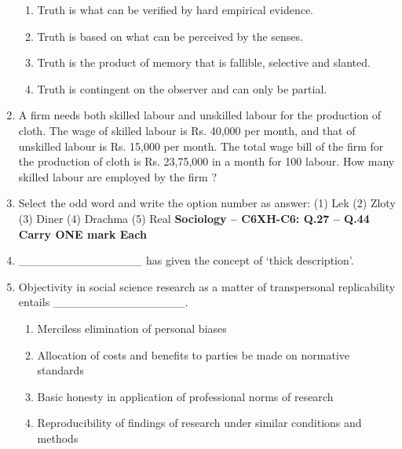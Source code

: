 \documentclass[12pt]{article}
\theoremstyle{remark}
\begin{document}
\begin{enumerate}
\begin{enumerate}
    \item Truth is what can be verified by hard empirical evidence.
    \item Truth is based on what can be perceived by the senses.
    \item Truth is the product of memory that is fallible, selective and slanted.
    \item Truth is contingent on the observer and can only be partial.
\end{enumerate}
\hfill{}
\item A firm needs both skilled labour and unskilled labour for the production of cloth. The wage of skilled labour is Rs. 40,000 per month, and that of unskilled labour is Rs. 15,000 per month. The total wage bill of the firm for the production of cloth is Rs. 23,75,000 in a month for 100 labour. How many skilled labour are employed by the firm ?
\hfill{}
\item Select the odd word and write the option number as answer: (1) Lek (2) Zloty (3) Diner (4) Drachma (5) Real
\hfill{}
\newpage
\textbf{Sociology – C6\newline XH-C6: Q.27 – Q.44 Carry ONE mark Each}
\item \_\_\_\_\_\_\_\_\_\_\_\_\_\_\_ has given the concept of ‘thick description’.
\begin{enumerate}
\end{enumerate}
\hfill{}
\item Objectivity in social science research as a matter of transpersonal replicability entails \_\_\_\_\_\_\_\_\_\_\_\_\_\_\_\_.
\begin{enumerate}
    \item Merciless elimination of personal biases
    \item Allocation of costs and benefits to parties be made on normative standards
    \item Basic honesty in application of professional norms of research 
    \item Reproducibility of findings of research under similar conditions and methods

\end{enumerate}
\end{enumerate}
\end{document}
